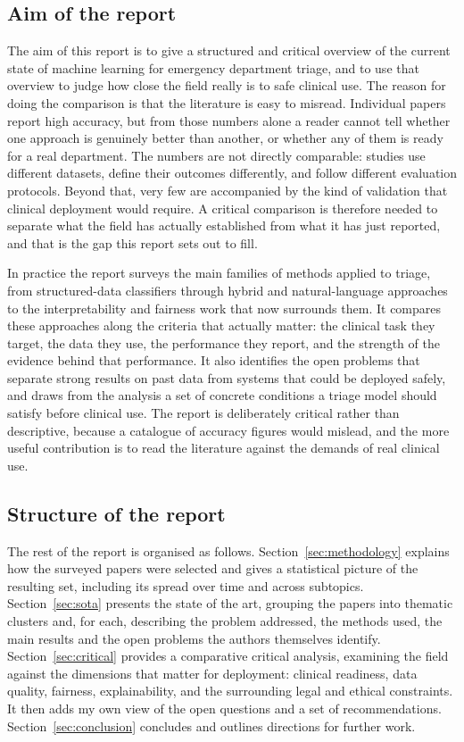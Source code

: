\documentclass[11pt]{article}
\begin{document}
\subsection{Aim of the report}

The aim of this report is to give a structured and critical overview of the current state of machine learning for emergency department triage, and to use that overview to judge how close the field really is to safe clinical use. The reason for doing the comparison is that the literature is easy to misread. Individual papers report high accuracy, but from those numbers alone a reader cannot tell whether one approach is genuinely better than another, or whether any of them is ready for a real department. The numbers are not directly comparable: studies use different datasets, define their outcomes differently, and follow different evaluation protocols. Beyond that, very few are accompanied by the kind of validation that clinical deployment would require. A critical comparison is therefore needed to separate what the field has actually established from what it has just reported, and that is the gap this report sets out to fill.

In practice the report surveys the main families of methods applied to triage, from structured-data classifiers through hybrid and natural-language approaches to the interpretability and fairness work that now surrounds them. It compares these approaches along the criteria that actually matter: the clinical task they target, the data they use, the performance they report, and the strength of the evidence behind that performance. It also identifies the open problems that separate strong results on past data from systems that could be deployed safely, and draws from the analysis a set of concrete conditions a triage model should satisfy before clinical use. The report is deliberately critical rather than descriptive, because a catalogue of accuracy figures would mislead, and the more useful contribution is to read the literature against the demands of real clinical use.

\subsection{Structure of the report}

The rest of the report is organised as follows. Section~\ref{sec:methodology} explains how the surveyed papers were selected and gives a statistical picture of the resulting set, including its spread over time and across subtopics. Section~\ref{sec:sota} presents the state of the art, grouping the papers into thematic clusters and, for each, describing the problem addressed, the methods used, the main results and the open problems the authors themselves identify. Section~\ref{sec:critical} provides a comparative critical analysis, examining the field against the dimensions that matter for deployment: clinical readiness, data quality, fairness, explainability, and the surrounding legal and ethical constraints. It then adds my own view of the open questions and a set of recommendations. Section~\ref{sec:conclusion} concludes and outlines directions for further work.
\end{document}
